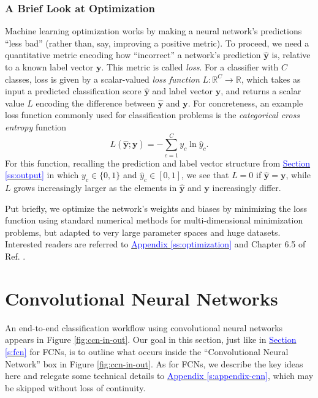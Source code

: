 \documentclass[11pt, a4paper]{article}
\newcommand{\myhref}[2]{\hyperref[#1]{\textcolor{blue}{#2}}}
\renewcommand{\vec}[1]{\bm{#1}}
\newcommand{\y}{\vec{y}}
\begin{document}
\subsubsection{A Brief Look at Optimization} \label{ss:optimization-brief}
Machine learning optimization works by making a neural network's predictions ``less bad'' (rather than, say, improving a positive metric). To proceed, we need a quantitative metric encoding how ``incorrect'' a network's prediction $ \hat{\y} $ is, relative to a known label vector $ \y $. This metric is called \textit{loss}. For a classifier with $ C $ classes, loss is given by a scalar-valued \textit{loss function} $ L : \mathbb{R}^{C} \to \mathbb{R} $, which takes as input a predicted classification score $ \hat{\y} $ and label vector $ \y $, and returns a scalar value $ L $ encoding the difference between $ \hat{\y} $ and $ \y $. For concreteness, an example loss function commonly used for classification problems is the \textit{categorical cross entropy} function
\begin{equation}
    L(\hat{\y}; \y) = - \sum_{c = 1}^{C} y_{c} \ln \hat{y}_{c}. \label{eq:loss-instance}
\end{equation}
For this function, recalling the prediction and label vector structure from \myhref{ss:output}{Section \ref{ss:output}} in which $ y_{c} \in \{0, 1\} $ and $ \hat{y}_{c} \in [0, 1] $, we see that $ L = 0 $ if $ \hat{\y} = \y $, while $ L $ grows increasingly larger as the elements in $ \hat{\y} $ and $ \y $ increasingly differ. 

Put briefly, we optimize the network's weights and biases by minimizing the loss function using standard numerical methods for multi-dimensional minimization problems, but adapted to very large parameter spaces and huge datasets. Interested readers are referred to \myhref{ss:optimization}{Appendix \ref{ss:optimization}} and Chapter 6.5 of Ref. \cite{goodfellow}.

\section{Convolutional Neural Networks}
An end-to-end classification workflow using convolutional neural networks appears in Figure \ref{fig:ccn-in-out}. Our goal in this section, just like in \myhref{s:fcn}{Section \ref{s:fcn}} for FCNs, is to outline what occurs inside the ``Convolutional Neural Network'' box in Figure \ref{fig:ccn-in-out}. As for FCNs, we describe the key ideas here and relegate some technical details to \myhref{s:appendix-cnn}{Appendix \ref{s:appendix-cnn}}, which may be skipped without loss of continuity.  %
\end{document}

